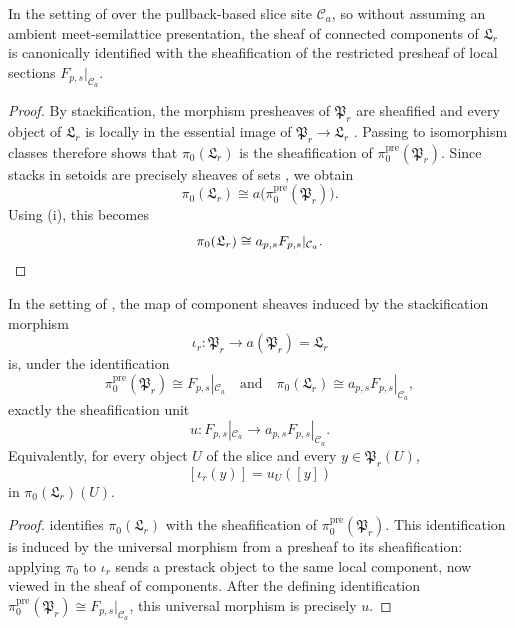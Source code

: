 \begin{proposition}\label{prop:stackification-components}
In the setting of  over the pullback-based slice site $\mathcal C_a$, so without assuming an ambient meet-semilattice presentation, the sheaf of connected components of $\mathfrak L_r$ is canonically identified with the sheafification of the restricted presheaf of local sections $F_{p,s}|_{\mathcal C_a}$.
\end{proposition}

\begin{proof}
By stackification, the morphism presheaves of $\mathfrak P_r$ are sheafified and every object of $\mathfrak L_r$ is locally in the essential image of $\mathfrak P_r\to \mathfrak L_r$ \cite[Tag 02ZP]{StacksProject}. Passing to isomorphism classes therefore shows that $\pi_0(\mathfrak L_r)$ is the sheafification of $\pi_0^{\mathrm{pre}}(\mathfrak P_r)$. Since stacks in setoids are precisely sheaves of sets \cite[Tag 042Y]{StacksProject}, we obtain
\[
\pi_0(\mathfrak L_r)\cong a\bigl(\pi_0^{\mathrm{pre}}(\mathfrak P_r)\bigr).
\]
Using (i), this becomes
\[
\pi_0(\mathfrak L_r)\cong a_{p,s}F_{p,s}|_{\mathcal C_a}.
\qedhere
\]
\end{proof}

\begin{proposition}\label{prop:stackification-component-unit-naturality}
In the setting of , the map of component
sheaves induced by the stackification morphism
\[
\iota_r:\mathfrak P_r\to a(\mathfrak P_r)=\mathfrak L_r
\]
is, under the identification
\[
\pi_0^{\mathrm{pre}}(\mathfrak P_r)\cong F_{p,s}|_{\mathcal C_a}
\quad\text{and}\quad
\pi_0(\mathfrak L_r)\cong a_{p,s}F_{p,s}|_{\mathcal C_a},
\]
exactly the sheafification unit
\[
u:F_{p,s}|_{\mathcal C_a}\longrightarrow
a_{p,s}F_{p,s}|_{\mathcal C_a}.
\]
Equivalently, for every object \(U\) of the slice and every
\(y\in\mathfrak P_r(U)\),
\[
[\iota_r(y)]=u_U([y])
\]
in \(\pi_0(\mathfrak L_r)(U)\).
\end{proposition}

\begin{proof}
 identifies
\(\pi_0(\mathfrak L_r)\) with the sheafification of
\(\pi_0^{\mathrm{pre}}(\mathfrak P_r)\). This identification is induced by
the universal morphism from a presheaf to its sheafification: applying
\(\pi_0\) to \(\iota_r\) sends a prestack object to the same local
component, now viewed in the sheaf of components. After the defining
identification
\(\pi_0^{\mathrm{pre}}(\mathfrak P_r)\cong F_{p,s}|_{\mathcal C_a}\), this
universal morphism is precisely \(u\).
\end{proof}

